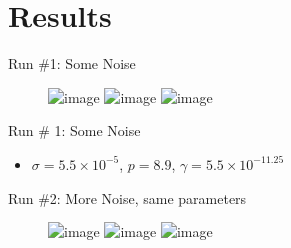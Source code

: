 \documentclass[xcolor=dvipsnames]{beamer}
\begin{document}
\section{Results}
\begin{frame}{Run \#1: Some Noise}
\begin{figure}[h!]
  \centering
  \begin{overprint}
  \includegraphics<1>[width=\linewidth]{ex1original.png}
  \includegraphics<2>[width=\linewidth]{ex1blurred.png}
  \includegraphics<3>[width=\linewidth]{ex1spd.png}
    \end{overprint}
\end{figure}
\end{frame}
\begin{frame}{Run \# 1: Some Noise}
\begin{itemize}
    \item $\sigma = 5.5\times 10^{-5}$, $p=8.9$, $\gamma = 5.5\times 10^{-11.25}$
\end{itemize}
\end{frame}
\begin{frame}{Run \#2: More Noise, same parameters}
    \begin{figure}[h!]
  \centering
  \begin{overprint}
  \includegraphics<1>[width=\linewidth]{ex2original.png}
  \includegraphics<2>[width=\linewidth]{ex2blurred.png}
  \includegraphics<3>[width=\linewidth]{ex2spd.png}
    \end{overprint}
\end{figure}
\end{frame}
\end{document}
